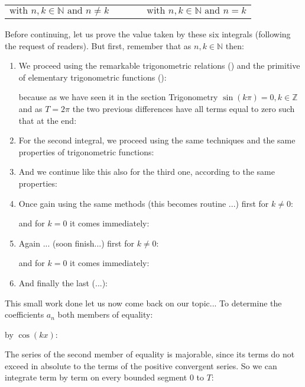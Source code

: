 	\begin{center}
	\begin{tabular}{ccc}
	$\text{with }n,k\in \mathbb{N}\text{ and }n\ne k$
	&$\qquad$&
	$\text{with }n,k\in \mathbb{N}\text{ and }n = k$
	\end{tabular}
	\end{center}
	Before continuing, let us prove the value taken by these six integrals (following the request of readers). But first, remember that as $n,k \in \mathbb{N}$ then:
	
	
	\begin{enumerate}
		\item We proceed using the remarkable trigonometric relations () and the primitive of elementary trigonometric functions ():
		
		because as we have seen it in the section Trigonometry $\sin(k\pi)=0,k\in\mathbb{Z}$ and as $T=2\pi$ the two previous differences have all terms equal to zero such that at the end:
		
		
		\item For the second integral, we proceed using the same techniques and the same properties of trigonometric functions:
		
		
		\item And we continue like this also for the third one, according to the same properties:
		
		
		\item Once gain using the same methods (this becomes routine ...) first for $k\neq 0$:
			
			and for $k=0$ it comes immediately:
			
			
			\item Again ... (soon finish...) first for $k\neq 0$:
			
			and for $k=0$ it comes immediately:
			
			
			\item And finally the last (...):
				
		\end{enumerate}
		This small work done let us now come back on our topic... To determine the coefficients $a_n$ both members of equality:
	
	by $\cos(kx)$:
	
	The series of the second member of equality is majorable, since its terms do not exceed in absolute to the terms of the positive convergent series. So we can integrate term by term on every bounded segment $0$ to $T$:
	
